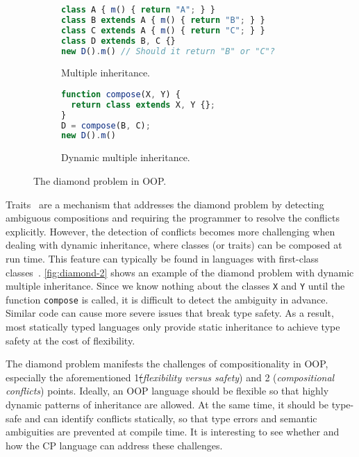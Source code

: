 \begin{figure}
\begin{subfigure}{.54\textwidth}
\begin{lstlisting}[language=TypeScript]
class A { m() { return "A"; } }
class B extends A { m() { return "B"; } }
class C extends A { m() { return "C"; } }
class D extends B, C {}
new D().m() // Should it return "B" or "C"?
\end{lstlisting}
\caption{Multiple inheritance.} \label{fig:diamond-1}
\end{subfigure}
\hfill
\begin{subfigure}{.39\textwidth}
\begin{lstlisting}[language=TypeScript]
function compose(X, Y) {
  return class extends X, Y {};
}
D = compose(B, C);
new D().m()
\end{lstlisting}
\caption{Dynamic multiple inheritance.} \label{fig:diamond-2}
\end{subfigure}
\caption{The diamond problem in OOP.}
\end{figure}

Traits~\citep{ducasse2006traits} are a mechanism that addresses the diamond
problem by detecting ambiguous compositions and requiring the programmer to
resolve the conflicts explicitly. However, the detection of conflicts becomes
more challenging when dealing with dynamic inheritance, where classes (or
traits) can be composed at run time. This feature can typically be found in
languages with first-class classes~\citep{takikawa2012gradual,lee2015theory}.
\autoref{fig:diamond-2} shows an example of the diamond problem with dynamic
multiple inheritance. Since we know nothing about the classes \lstinline{X} and
\lstinline{Y} until the function \lstinline{compose} is called, it is difficult
to detect the ambiguity in advance. Similar code can cause more severe issues
that break type safety. As a result, most statically typed languages only
provide static inheritance to achieve type safety at the cost of flexibility.

The diamond problem manifests the challenges of compositionality in OOP,
especially the aforementioned 1\st (\emph{flexibility versus safety}) and 2\nd
(\emph{compositional conflicts}) points. Ideally, an OOP language should be
flexible so that highly dynamic patterns of inheritance are allowed. At the same
time, it should be type-safe and can identify conflicts statically, so that type
errors and semantic ambiguities are prevented at compile time. It is interesting
to see whether and how the CP language can address these challenges.

